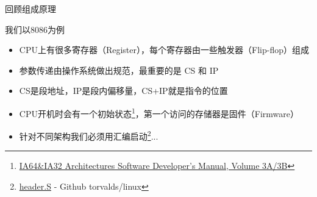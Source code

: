\documentclass[aspectratio=1610]{beamer}
\begin{document}
\begin{frame}[t]{回顾组成原理}
    \newline
    
    我们以8086为例
    \begin{center}
        \begin{itemize}
            \item CPU上有很多寄存器（Register），每个寄存器由一些触发器（Flip-flop）组成
            \item 参数传递由操作系统做出规范，最重要的是 \alert{CS} 和 \alert{IP}
            \item CS是段地址，IP是段内偏移量，CS+IP就是指令的位置
            \item CPU开机时会有一个\alert{初始状态}\footnote{\href{https://www.intel.com/content/www/us/en/developer/articles/technical/intel-sdm.html}{IA64\&IA32 Architectures Software Developer’s Manual, Volume 3A/3B}}，第一个访问的存储器是固件（Firmware）
            \item 针对不同架构我们必须用汇编启动\footnote{\href{https://github.com/torvalds/linux/blob/master/arch/x86/boot/header.S}{header.S} - Github torvalds/linux}...
        \end{itemize}
    \end{center}
\end{frame}
\end{document}
